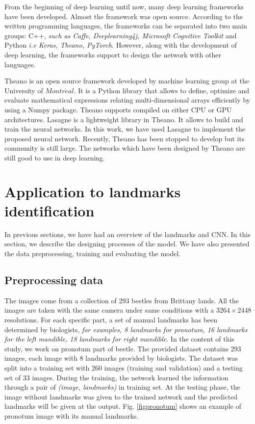 \documentclass[conference]{IEEEtran}
\begin{document}
From the beginning of deep learning until now, many deep learning frameworks have been developed. Almost the framework was open source. According to the written programming languages, the frameworks can be separated into two main groups: C++, \textit{such as Caffe, Deeplearning4j, Microsoft Cognitive Toolkit} and Python \textit{i.e Keras, Theano, PyTorch}.  However, along with the development of deep learning, the frameworks support to design the network with other languages.

Theano is an open source framework developed by machine learning group at the University of $Montr\acute{e}al$. It is a Python library that allows to define, optimize and evaluate mathematical expressions relating multi-dimensional arrays efficiently by using a Numpy package. Theano supports compiled on either CPU or GPU architectures. Lasagne \cite{lasagne} is a lightweight library in Theano. It allows to build and train the neural networks. In this work, we have used Lasagne to implement the proposed neural network. Recently, Theano has been stopped to develop but its community is still large. The networks which have been designed by Theano are still good to use in deep learning.
\section{Application to landmarks identification}
In previous sections, we have had an overview of the landmarks and CNN. In this section, we describe the designing processes of the model. We have also presented the data preprocessing, training and evaluating the model.
\subsection{Preprocessing data}
The images come from a collection of 293 beetles from Brittany lands. All the images are taken with the same camera under same conditions with a $3264 \times 2448$ resolutions. For each specific part, a set of manual landmarks has been determined by biologists, \textit{for examples, 8 landmarks for pronotum, 16 landmarks for the left mandible, 18 landmarks for right mandible}. In the content of this study, we work on pronotum part of beetle. The provided dataset contains 293 images, each image with 8 landmarks provided by biologists. The dataset was split into a training set with 260 images (training and validation) and a testing set of 33 images. During the training, the network learned the information through a pair of \textit{(image, landmarks)} in training set. At the testing phase, the image without landmarks was given to the trained network and the predicted landmarks will be given at the output. Fig. \ref{figpronotum} shows an example of pronotum image with its manual landmarks.
\end{document}
